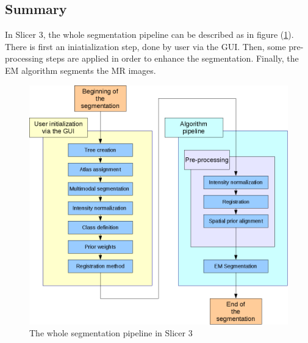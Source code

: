 \subsection{Summary}
In Slicer 3, the whole segmentation pipeline can be described as in figure (\ref{fig:Wpipeline}). There is first an iniatialization step, done by user via the GUI. Then, some pre-processing steps are applied in order to enhance the segmentation. Finally, the EM algorithm segments the MR images.

  \begin{figure}[ht]\centering
  \includegraphics[width=1\textwidth]{Images/Graphics/wholepipeline.png}
  \caption{The whole segmentation pipeline in Slicer 3}\label{fig:Wpipeline}
  \end{figure}

%
